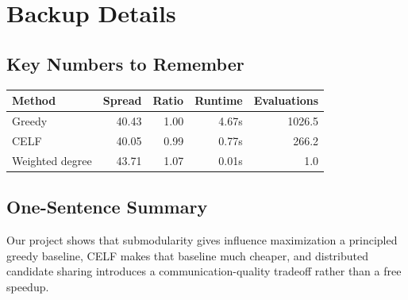 \documentclass[10pt]{article}
\begin{document}
\section{Backup Details}

\subsection*{Key Numbers to Remember}

\begin{center}
\begin{tabular}{lrrrr}
\toprule
Method & Spread & Ratio & Runtime & Evaluations \\
\midrule
Greedy & 40.43 & 1.00 & 4.67s & 1026.5 \\
CELF & 40.05 & 0.99 & 0.77s & 266.2 \\
Weighted degree & 43.71 & 1.07 & 0.01s & 1.0 \\
\bottomrule
\end{tabular}
\end{center}

\subsection*{One-Sentence Summary}

Our project shows that submodularity gives influence maximization a principled
greedy baseline, CELF makes that baseline much cheaper, and distributed
candidate sharing introduces a communication-quality tradeoff rather than a
free speedup.
\end{document}
